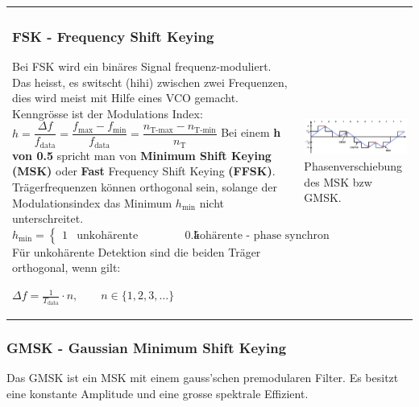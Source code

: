 \begin{tabular}{ll}
	\parbox{9cm}{
		\subsubsection{FSK - Frequency Shift Keying }
		Bei FSK wird ein binäres Signal frequenz-moduliert. Das heisst,
		es switscht (hihi) zwischen zwei Frequenzen, dies wird meist mit Hilfe eines
		VCO gemacht.\\
		Kenngrösse ist der Modulations Index: \\
		$h=\dfrac{\Delta f}{f_{\text{data}}}=\dfrac{f_{\text{max}} -
		f_{\text{min}}}{f_{\text{data}}} =\dfrac{n_{\text{T-max}} -
		n_{\text{T-min}}}{n_\text{T}}$ \\ Bei einem \textbf{h von 0.5 }spricht man von
		\textbf{Minimum Shift Keying (MSK)} oder \textbf{Fast} Frequency Shift Keying
		\textbf{(FFSK)}. Trägerfrequenzen können orthogonal sein, solange der
		Modulationsindex das Minimum $h_{\text{min}}$ nicht unterschreitet. \\ $h_{\text{min}} =
		\begin{cases} 1   & \text{unkohärente Detektion} \\                                
                                0.5   & \text{kohärente - phase
                                synchron - Detektion} \end{cases}$\\
        Für unkohärente Detektion sind die beiden Träger orthogonal, wenn gilt:
        \\
        $    \Delta f = \frac{1}{T_{\text{data}}} \cdot n , \qquad n \in \lbrace
        1, 2, 3, \ldots \rbrace $
	}
	&\parbox{9cm}{
	\includegraphics[width=9cm]{./bilder/modulation_phasenverschiebungGMSK_MSK.png}\\
	Phasenverschiebung des MSK bzw GMSK. }
\end{tabular}
     
        
\subsubsection{GMSK - Gaussian Minimum Shift Keying }
Das GMSK ist ein MSK mit einem gauss'schen premodularen Filter. Es besitzt eine
konstante Amplitude und eine grosse spektrale Effizient.
        

